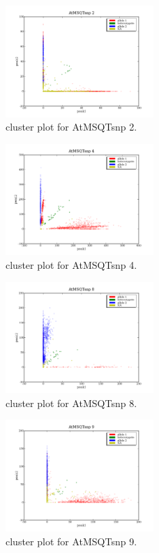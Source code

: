 \begin{figure}[H]
\includegraphics[width=0.5\textwidth]{figures/cluster_plot_AtMSQTsnp_2.png}
\caption{cluster plot for AtMSQTsnp 2.} \label{flAtMSQTsnp2}
\end{figure}
\begin{figure}[H]
\includegraphics[width=0.5\textwidth]{figures/cluster_plot_AtMSQTsnp_4.png}
\caption{cluster plot for AtMSQTsnp 4.} \label{flAtMSQTsnp4}
\end{figure}
\begin{figure}[H]
\includegraphics[width=0.5\textwidth]{figures/cluster_plot_AtMSQTsnp_8.png}
\caption{cluster plot for AtMSQTsnp 8.} \label{flAtMSQTsnp8}
\end{figure}
\begin{figure}[H]
\includegraphics[width=0.5\textwidth]{figures/cluster_plot_AtMSQTsnp_9.png}
\caption{cluster plot for AtMSQTsnp 9.} \label{flAtMSQTsnp9}
\end{figure}
